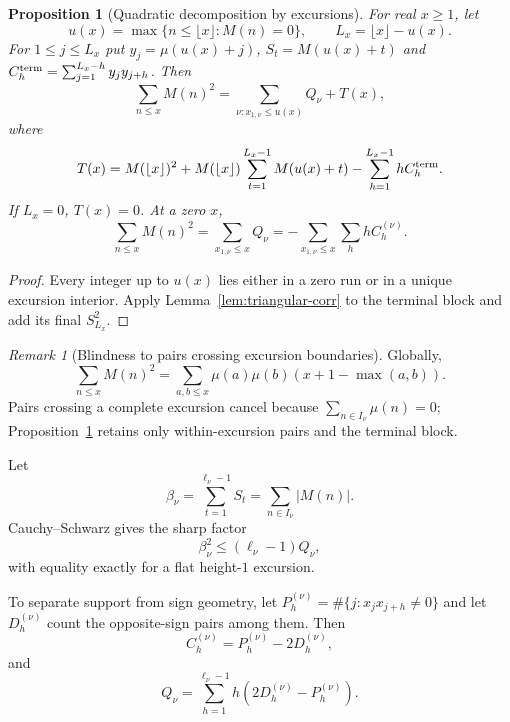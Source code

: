 \documentclass[11pt]{amsart}
\numberwithin{equation}{section}
\theoremstyle{plain}
\newtheorem{proposition}[theorem]{Proposition}
\theoremstyle{definition}
\theoremstyle{remark}
\newtheorem{remark}[theorem]{Remark}
\begin{document}
\begin{proposition}[Quadratic decomposition by excursions]
\label{prop:quadratic-decomp}
For real $x\ge1$, let
\[
u(x)=\max\{n\le\lfloor x\rfloor:M(n)=0\},\qquad
L_x=\lfloor x\rfloor-u(x).
\]
For $1\le j\le L_x$ put $y_j=\mu(u(x)+j)$,
$S_t=M(u(x)+t)$ and
$C_h^{\rm term}=\sum_{j=1}^{L_x-h}y_jy_{j+h}$. Then
\begin{equation}
\label{eq:quadratic-decomp-general}
\sum_{n\le x}M(n)^2
=\sum_{\nu:x_{1,\nu}\le u(x)}Q_\nu+T(x),
\end{equation}
where
\begin{equation}
\label{eq:terminal-Q-exact}
T(x)=M(\lfloor x\rfloor)^2
+M(\lfloor x\rfloor)\sum_{t=1}^{L_x-1}M(u(x)+t)
-\sum_{h=1}^{L_x-1}hC_h^{\rm term}.
\end{equation}
If $L_x=0$, $T(x)=0$.  At a zero $x$,
\begin{equation}
\label{eq:quadratic-decomp-zero}
\sum_{n\le x}M(n)^2
=\sum_{x_{1,\nu}\le x}Q_\nu
=-\sum_{x_{1,\nu}\le x}\sum_hhC_h^{(\nu)}.
\end{equation}
\end{proposition}

\begin{proof}
Every integer up to $u(x)$ lies either in a zero run or in a unique excursion
interior.  Apply Lemma~\ref{lem:triangular-corr} to the terminal block and
add its final $S_{L_x}^2$.
\end{proof}

\begin{remark}[Blindness to pairs crossing excursion boundaries]
\label{rem:blindness-quadratic}
Globally,
\[
\sum_{n\le x}M(n)^2
=\sum_{a,b\le x}\mu(a)\mu(b)(x+1-\max(a,b)).
\]
Pairs crossing a complete excursion cancel because
$\sum_{n\in I_\nu}\mu(n)=0$; Proposition~\ref{prop:quadratic-decomp} retains
only within-excursion pairs and the terminal block.
\end{remark}

Let
\begin{equation}
\label{eq:beta_def}
\beta_\nu=\sum_{t=1}^{\ell_\nu-1}S_t
=\sum_{n\in I_\nu}|M(n)|.
\end{equation}
Cauchy--Schwarz gives the sharp factor
\begin{equation}
\label{eq:beta-Q}
\beta_\nu^2\le(\ell_\nu-1)Q_\nu,
\end{equation}
with equality exactly for a flat height-$1$ excursion.

To separate support from sign geometry, let
$P_h^{(\nu)}=\#\{j:x_jx_{j+h}\ne0\}$ and let $D_h^{(\nu)}$ count the
opposite-sign pairs among them. Then
\begin{equation}
\label{eq:C-P-D}
C_h^{(\nu)}=P_h^{(\nu)}-2D_h^{(\nu)},
\end{equation}
and
\begin{equation}
\label{eq:Q-P-D}
Q_\nu=\sum_{h=1}^{\ell_\nu-1}h(2D_h^{(\nu)}-P_h^{(\nu)}).
\end{equation}
\end{document}
